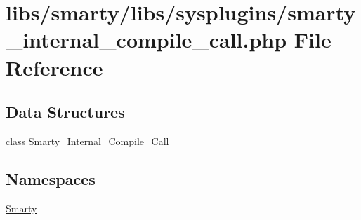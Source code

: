 \hypertarget{smarty__internal__compile__call_8php}{}\section{libs/smarty/libs/sysplugins/smarty\+\_\+internal\+\_\+compile\+\_\+call.php File Reference}
\label{smarty__internal__compile__call_8php}
\subsection*{Data Structures}
\begin{DoxyCompactItemize}
\item 
class \hyperlink{class_smarty___internal___compile___call}{Smarty\+\_\+\+Internal\+\_\+\+Compile\+\_\+\+Call}
\end{DoxyCompactItemize}
\subsection*{Namespaces}
\begin{DoxyCompactItemize}
\item 
 \hyperlink{namespace_smarty}{Smarty}
\end{DoxyCompactItemize}
